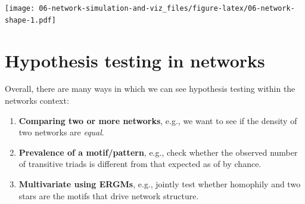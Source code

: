 \documentclass[]{book}
\newenvironment{Shaded}{\begin{snugshade}}{\end{snugshade}}
\newcommand{\DataTypeTok}[1]{\textcolor[rgb]{0.13,0.29,0.53}{#1}}
\newcommand{\DecValTok}[1]{\textcolor[rgb]{0.00,0.00,0.81}{#1}}
\newcommand{\KeywordTok}[1]{\textcolor[rgb]{0.13,0.29,0.53}{\textbf{#1}}}
\newcommand{\NormalTok}[1]{#1}
\newcommand{\OperatorTok}[1]{\textcolor[rgb]{0.81,0.36,0.00}{\textbf{#1}}}
\newcommand{\StringTok}[1]{\textcolor[rgb]{0.31,0.60,0.02}{#1}}
\begin{document}
\begin{Shaded}
\end{Shaded}

\texttt{[image: 06-network-simulation-and-viz\_files/figure-latex/06-network-shape-1.pdf]}

\hypertarget{hypothesis-testing-in-networks}{%
\chapter{Hypothesis testing in networks}\label{hypothesis-testing-in-networks}}

Overall, there are many ways in which we can see hypothesis testing within
the networks context:

\begin{enumerate}
\def\labelenumi{\arabic{enumi}.}
\item
  \textbf{Comparing two or more networks}, e.g., we want to see if the density of
  two networks are \emph{equal}.
\item
  \textbf{Prevalence of a motif/pattern}, e.g., check whether the observed number
  of transitive triads is different from that expected as of by chance.
\item
  \textbf{Multivariate using ERGMs}, e.g., jointly test whether homophily and
  two stars are the motifs that drive network structure.
\end{enumerate}
\end{document}
